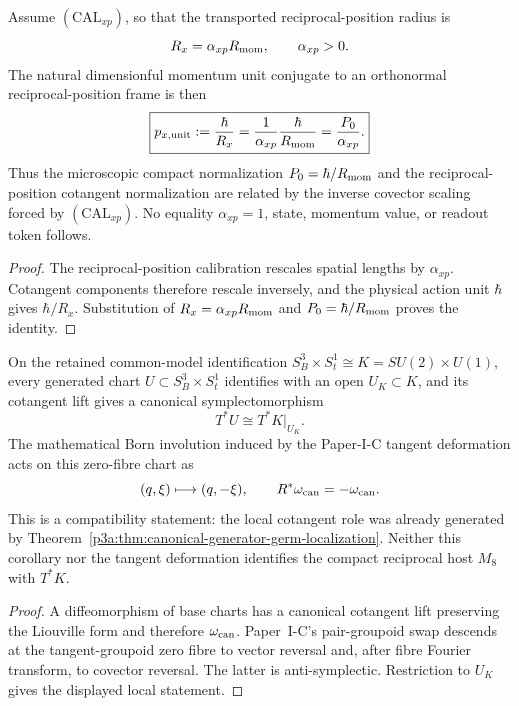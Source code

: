 \documentclass[12pt,a4paper]{article}
\begin{document}
\begin{corollary}
\label{p3a:cor:calibrated-reciprocal-position-momentum-unit}
Assume $(\mathrm{CAL}_{xp})$, so that the transported reciprocal-position
radius is
\[
 R_x=\alpha_{xp}R_{\mathrm{mom}},
 \qquad \alpha_{xp}>0.
\]
The natural dimensionful momentum unit conjugate to an orthonormal
reciprocal-position frame is then
\begin{equation}
 \label{p3a:eq:calibrated-reciprocal-position-momentum-unit}
 \boxed{
 p_{x,\rm unit}:=\frac{\hbar}{R_x}
 =\frac1{\alpha_{xp}}\frac{\hbar}{R_{\mathrm{mom}}}
 =\frac{P_{0}}{\alpha_{xp}}.}
\end{equation}
Thus the microscopic compact normalization $P_{0}=\hbar/R_{\mathrm{mom}}$ and the
reciprocal-position cotangent normalization are related by the inverse
covector scaling forced by $(\mathrm{CAL}_{xp})$.  No equality
$\alpha_{xp}=1$, state, momentum value, or readout token follows.
\end{corollary}

\begin{proof}
The reciprocal-position calibration rescales spatial lengths by
$\alpha_{xp}$.  Cotangent components therefore rescale inversely, and the
physical action unit $\hbar$ gives $\hbar/R_x$.  Substitution of
$R_x=\alpha_{xp}R_{\mathrm{mom}}$ and $P_{0}=\hbar/R_{\mathrm{mom}}$ proves the identity.
\end{proof}

\begin{corollary}
\label{p3a:cor:local-cotangent-born-compatibility}
On the retained common-model identification
\(S_B^3\times S_t^1\cong K=SU(2)\times U(1)\), every generated chart
\(U\subset S_B^3\times S_t^1\) identifies with an open
\(U_K\subset K\), and its cotangent lift gives a canonical symplectomorphism
\[
 T^*U\cong T^*K|_{U_K}.
\]
The mathematical Born involution induced by the Paper-I-C tangent deformation
acts on this zero-fibre chart as
\[
 (q,\xi)\longmapsto(q,-\xi),
 \qquad
 R^*\omega_{\rm can}=-\omega_{\rm can}.
\]
This is a compatibility statement: the local cotangent role was already
generated by Theorem~\ref{p3a:thm:canonical-generator-germ-localization}.
Neither this corollary nor the tangent deformation identifies the compact
reciprocal host \(M_8\) with \(T^*K\).
\end{corollary}
\begin{proof}
A diffeomorphism of base charts has a canonical cotangent lift preserving the
Liouville form and therefore \(\omega_{\rm can}\).  Paper~I-C's pair-groupoid
swap descends at the tangent-groupoid zero fibre to vector reversal and, after
fibre Fourier transform, to covector reversal.  The latter is
anti-symplectic.  Restriction to \(U_K\) gives the displayed local statement.
\end{proof}
\end{document}
